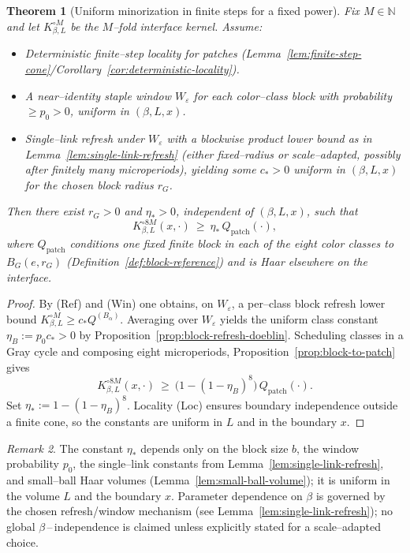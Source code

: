 \documentclass[11pt]{amsart}
\theoremstyle{plain}
\newtheorem{theorem}{Theorem}[section]
\theoremstyle{definition}
\theoremstyle{remark}
\newtheorem{remark}[theorem]{Remark}
\begin{document}
\begin{theorem}[Uniform minorization in finite steps for a fixed power]\label{thm:uniform-minorization-fixed-power}
Fix $M\in\mathbb N$ and let $K_{\beta,L}^{\circ M}$ be the $M$--fold interface kernel. Assume:
\begin{itemize}
  \item[(Loc)] Deterministic finite--step locality for patches (Lemma~\ref{lem:finite-step-cone}/Corollary~\ref{cor:deterministic-locality}).
  \item[(Win)] A near--identity staple window $W_\varepsilon$ for each color--class block with probability $\ge p_0>0$, uniform in $(\beta,L,x)$.
  \item[(Ref)] Single--link refresh under $W_\varepsilon$ with a blockwise product lower bound as in Lemma~\ref{lem:single-link-refresh} (either fixed--radius or scale--adapted, possibly after finitely many microperiods), yielding some $c_*>0$ uniform in $(\beta,L,x)$ for the chosen block radius $r_G$.
\end{itemize}
Then there exist $r_G>0$ and $\eta_*>0$, independent of $(\beta,L,x)$, such that
\[
  K_{\beta,L}^{\circ 8M}(x,\cdot)\ \ge\ \eta_*\, Q_{\mathrm{patch}}(\cdot),
\]
where $Q_{\mathrm{patch}}$ conditions one fixed finite block in each of the eight color classes to $B_G(e,r_G)$ (Definition~\ref{def:block-reference}) and is Haar elsewhere on the interface.
\end{theorem}
\begin{proof}
By (Ref) and (Win) one obtains, on $W_\varepsilon$, a per--class block refresh lower bound $K_{\beta,L}^{\circ M}\ge c_* Q^{(B_\alpha)}$. Averaging over $W_\varepsilon$ yields the uniform class constant $\eta_B:=p_0 c_*>0$ by Proposition~\ref{prop:block-refresh-doeblin}. Scheduling classes in a Gray cycle and composing eight microperiods, Proposition~\ref{prop:block-to-patch} gives
\[
  K_{\beta,L}^{\circ 8M}(x,\cdot)\ \ge\ \big(1-(1-\eta_B)^8\big)\, Q_{\mathrm{patch}}(\cdot).
\]
Set $\eta_*:=1-(1-\eta_B)^8$. Locality (Loc) ensures boundary independence outside a finite cone, so the constants are uniform in $L$ and in the boundary $x$.
\end{proof}
\begin{remark}
The constant $\eta_*$ depends only on the block size $b$, the window probability $p_0$, the single--link constants from Lemma~\ref{lem:single-link-refresh}, and small--ball Haar volumes (Lemma~\ref{lem:small-ball-volume}); it is uniform in the volume $L$ and the boundary $x$. Parameter dependence on $\beta$ is governed by the chosen refresh/window mechanism (see Lemma~\ref{lem:single-link-refresh}); no global $\beta$\,–\,independence is claimed unless explicitly stated for a scale--adapted choice.
\end{remark}
\end{document}
